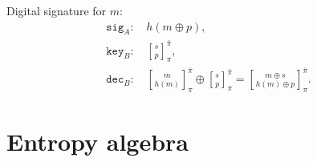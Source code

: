 \documentclass[twocolumn, aps, amsmath, amssymb, nofootinbib, superscriptaddress, longbibliography, doublefloatfix, table-of-contents, eqsecnum, rmp]{revtex4-2}
\newcommand{\stackbraid}[2]{{\genfrac{[}{]}{0pt}{}{{#1}}{{#2}}}^{\bar{\pi}}_{\pi}}
\begin{document}
Digital signature for $m$:
\begin{align}
	\mathtt{sig}_A:\, &h(m \oplus p),\nonumber\\
	\mathtt{key}_B:\, &\stackbraid{s}{p},\nonumber\\
	\mathtt{dec}_B:\, &\stackbraid{m}{h(m)}\oplus \stackbraid{s}{p} = \stackbraid{m\oplus s}{h(m)\oplus p}.
\end{align}


%

\section{Entropy algebra}
\end{document}

